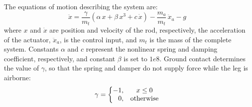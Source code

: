 \documentclass[letterpaper, 10 pt, conference]{ieeeconf}  %
\begin{document}
The equations of motion describing the system are:
%	
\begin{equation}
		\ddot{x} = \frac{\gamma}{m_t} \left(\alpha\,x + \beta\,x^3 + c\,\dot{x}\right)-\frac{m_a}{m_t}\,\ddot{x}_a-g
\end{equation}
%
where $x$ and $\dot{x}$ are position and velocity of the rod, respectively, the acceleration of the actuator, $\ddot{x}_a$, is the control input, and $m_t$ is the mass of the complete system. Constants $\alpha$ and $c$ represent the nonlinear spring and damping coefficient, respectively, and constant $\beta$ is set to $1e8$. Ground contact determines the value of $\gamma$, so that the spring and damper do not supply force while the leg is airborne:
%
	\begin{equation}
		\gamma =
		\left\{\begin{matrix}
		   -1, & x \leq 0\\ 
		   \hphantom{-} 0, & \mbox{otherwise}
		   \end{matrix}\right.
	 \end{equation}
%
\end{document}
